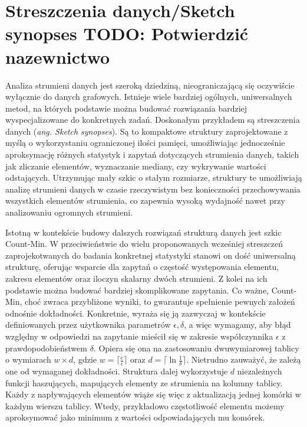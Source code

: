 \section{Streszczenia danych/Sketch synopses TODO: Potwierdzić nazewnictwo}
    Analiza strumieni danych jest szeroką dziedziną, nieograniczającą się oczywiście wyłącznie do danych grafowych. Istnieje wiele bardziej ogólnych, uniwersalnych metod, na których podstawie można budować rozwiązania bardziej wyspecjalizowane do konkretnych zadań. Doskonałym przykładem są streszczenia danych (\emph{ang. Sketch synopses}). Są to kompaktowe struktury zaprojektowane z myślą o wykorzystaniu ograniczonej ilości pamięci, umożliwiając jednocześnie aproksymację różnych statystyk i zapytań dotyczących strumienia danych, takich jak zliczanie elementów, wyznaczanie mediany, czy wykrywanie wartości odstających. Utrzymując mały szkic o stałym rozmiarze, struktury te umożliwiają analizę strumieni danych w czasie rzeczywistym bez konieczności przechowywania wszystkich elementów strumienia, co zapewnia wysoką wydajność nawet przy analizowaniu ogromnych strumieni.
    
    Istotną w kontekście budowy dalszych rozwiązań strukturą danych jest szkic Count-Min\cite{Cormode_Muthukrishnan_2005}. W przeciwieństwie do wielu proponowanych wcześniej streszczeń zaprojekotwanych do badania konkretnej statystyki stanowi on dość uniwersalną strukturę, oferując wsparcie dla zapytań o częstość występowania elementu, zakresu elementów oraz iloczyn skalarny dwóch strumieni. Z kolei na ich podstawie można budować bardziej skomplikowane zapytania. Co ważne, Count-Min, choć zwraca przybliżone wyniki, to gwarantuje spełnienie pewnych założeń odnośnie dokładności. Konkretnie, wyraża się ją zazwyczaj w kontekście definiowanych przez użytkownika parametrów $\epsilon, \delta$, a więc wymagamy, aby błąd względny w odpowiedzi na zapytanie mieścił się w zakresie współczynnika $\epsilon$ z prawdopodobieństwem $\delta$. Opiera się ona na zastosowaniu dwuwymiarowej tablicy o wymiarach $w \times d$, gdzie $w = \lceil \frac{e}{\epsilon} \rceil$ oraz $d = \lceil \ln \frac{1}{\delta} \rceil$. Nietrudno zauważyć, że zależą one od wymaganej dokładności. Struktura dalej wykorzystuje $d$ niezależnych funkcji haszujących, mapujących elementy ze strumienia na kolumny tablicy. Każdy z napływających elementów wiąże się więc z aktualizacją jednej komórki w każdym wierszu tablicy. Wtedy, przykładowo częstotliwość elementu możemy aproksymować jako minimum z wartości odpowiadających mu komórek. 

